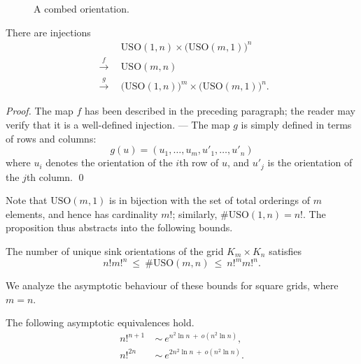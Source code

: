 \documentclass[runningheads,a4paper]{llncs}
\newcommand{\USO}{\ensuremath{\mathrm{USO}}}
\begin{document}
\begin{figure}
    \centering
    \def\svgwidth{200pt}
    
    \caption{A combed orientation.}
    \label{fig:combed}
\end{figure}

\begin{proposition}
    There are injections
    \begin{align*}
        &
        \USO(1,n) \times \bigl( \USO(m,1) \bigr)^n
        \\
        ~~\stackrel{f}{\longrightarrow}~~
        &
        \USO(m,n)
        \\
        ~~\stackrel{g}{\longrightarrow}~~
        &
        \bigl( \USO(1,n) \bigr)^m \times \bigl( \USO(m,1) \bigr)^n .
    \end{align*}
\end{proposition}

\begin{proof}
    The map $f$ has been described in the preceding paragraph; the reader may
    verify that it is a well-defined injection.
    ---
    The map $g$ is simply defined in terms of rows and columns:
    \[ g(u) = (u_1, \dots, u_m, u'_1, \dots, u'_n) \]
    where $u_i$ denotes the orientation of the $i$th row of $u$, and $u'_j$ is
    the orientation of the $j$th column.
    \qed
\end{proof}

Note that $\USO(m,1)$ is in bijection with the set of total orderings of $m$
elements, and hence has cardinality $m!$; similarly, $\#\USO(1,n) = n!$.
The proposition thus abstracts into the following bounds.

\begin{corollary}
    \label{cor:num-USO-mn}
    The number of unique sink orientations of the grid
    $K_m \times K_n$ satisfies
    \[
        n! m!^n ~\le~ \#\USO(m,n) ~\le~ n!^m m!^n.
    \]
\end{corollary}

\noindent
We analyze the asymptotic behaviour of these bounds for square grids, where
$m=n$.

\begin{lemma}
    \label{lem:asymptotics-USO-nn}
    The following asymptotic equivalences hold.
    \begin{align*}
        n!^{n+1} ~&\sim~
            e ^ { n^2 \ln n ~+~ o(n^2 \ln n) },
        \\
        n!^{2n} ~&\sim~
            e ^ { 2n^2 \ln n ~+~ o(n^2 \ln n) }.
    \end{align*}
\end{lemma}
\end{document}
